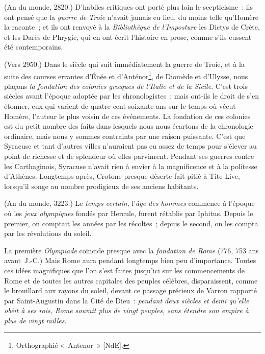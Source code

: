 \documentclass[french,twoside]{book} %
\begin{document}
(An du monde, 2820.) D’habiles critiques ont porté plus loin le scepticisme : ils ont pensé que la {\itshape guerre de Troie} n’avait  jamais eu lieu, du moins telle qu’Homère la raconte ; et ils ont renvoyé à la {\itshape Bibliothèque de l’Imposture} les Dictys de Crète, et les Darès de Phrygie, qui en ont écrit l’histoire en prose, comme s’ils eussent été contemporains.\par
\par
(Vers 2950.) Dans le siècle qui suit immédiatement la guerre de Troie, et à la suite des courses errantes d’Énée et d’Anténor\footnote{Orthographié « Antenor » [NdE].}, de Diomède et d’Ulysse, nous plaçons {\itshape la fondation des colonies grecques de l’Italie et de la Sicile}. C’est trois siècles avant l’époque adoptée par les chronologistes ; mais ont-ils le droit de s’en étonner, eux qui varient de quatre cent soixante ans sur le temps où vécut Homère, l’auteur  le plus voisin de ces événements. La fondation de ces colonies est du petit nombre des faits dans lesquels nous nous écartons de la chronologie ordinaire, mais nous y sommes contraints par une raison puissante. C’est que Syracuse et tant d’autres villes n’auraient pas eu assez de temps pour s’élever au point de richesse et de splendeur où elles parvinrent. Pendant ses guerres contre les Carthaginois, Syracuse n’avait rien à envier à la magnificence et à la politesse d’Athènes. Longtemps après, Crotone presque déserte fait pitié à Tite-Live, lorsqu’il songe au nombre prodigieux de ses anciens habitants.\par
(An du monde, 3223.) Le {\itshape temps certain}, l’{\itshape âge des hommes} commence à l’époque où les {\itshape jeux olympiques} fondés par Hercule, furent rétablis par Iphitus. Depuis le premier, on comptait les années par les récoltes ; depuis le second, on les compta par les révolutions du soleil.\par
La première {\itshape Olympiade} coïncide presque avec la {\itshape fondation de Rome} (776, 753 ans avant J.-C.) Mais Rome aura pendant longtemps bien peu d’importance. Toutes ces idées magnifiques que l’on s’est faites jusqu’ici sur les commencements de Rome et de toutes les autres capitales des peuples célèbres, disparaissent, comme le brouillard aux rayons du soleil, devant ce passage précieux de Varron rapporté par Saint-Augustin dans la Cité de Dieu : \emph{{\itshape pendant deux siècles et demi qu’elle obéit à ses rois, Rome soumit plus de vingt peuples, sans étendre son empire à plus de vingt milles}}.\par
\end{document}
